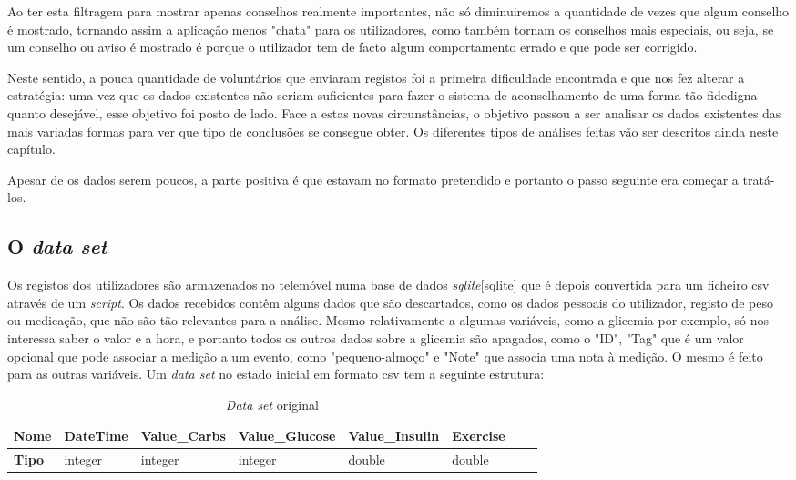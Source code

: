 Ao ter esta filtragem para mostrar apenas conselhos realmente importantes, não só diminuiremos a quantidade de vezes que algum conselho é mostrado, tornando assim a aplicação menos "chata" para os utilizadores, como também tornam os conselhos mais especiais, ou seja, se um conselho ou aviso é mostrado é porque o utilizador tem de facto algum comportamento errado e que pode ser corrigido.

Neste sentido, a pouca quantidade de voluntários que enviaram registos foi a primeira dificuldade encontrada e que nos fez alterar a estratégia: uma vez que os dados existentes não seriam suficientes para fazer o sistema de aconselhamento de uma forma tão fidedigna quanto desejável, esse objetivo foi posto de lado. Face a estas novas circunstâncias, o objetivo passou a ser analisar os dados existentes das mais variadas formas para ver que tipo de conclusões se consegue obter. Os diferentes tipos de análises feitas vão ser descritos ainda neste capítulo.

Apesar de os dados serem poucos, a parte positiva é que estavam no formato pretendido e portanto o passo seguinte era começar a tratá-los.


\subsection{O \textit{data set}}

Os registos dos utilizadores são armazenados no telemóvel numa base de dados \textit{sqlite}[sqlite] que é depois convertida para um ficheiro csv através de um \textit{script}. Os dados recebidos contêm alguns dados que são descartados, como os dados pessoais do utilizador, registo de peso ou medicação, que não são tão relevantes para a análise. Mesmo relativamente a algumas variáveis, como a glicemia por exemplo, só nos interessa saber o valor e a hora, e portanto todos os outros dados sobre a glicemia são apagados, como o "ID", "Tag" que é um valor opcional que pode associar a medição a um evento, como "pequeno-almoço" e "Note" que associa uma nota à medição. O mesmo é feito para as outras variáveis. Um \textit{data set} no estado inicial em formato csv tem a seguinte estrutura:

\begin{table}[!h]
\centering

\label{my-label}
\tabcolsep=0.11cm
\begin{tabular}{|l|l|l|l|l|l|l|l|}
\hline
\textbf{Nome} & DateTime  & Value\_Carbs & Value\_Glucose & Value\_Insulin & Exercise \\ \hline
\textbf{Tipo} & integer   & integer      & integer        & double         & double   \\ \hline
\end{tabular}
\caption{\textit{Data set} original}
\end{table}

